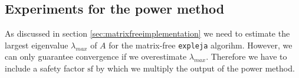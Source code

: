 \documentclass{scrartcl}
\begin{document}
	\subsection{Experiments for the power method}
	As discussed in section \ref{sec:matrixfreeimplementation} we need to estimate the largest eigenvalue $\lambda_{max}$ of $A$ for the matrix-free \texttt{expleja} algorihm. However, we can only guarantee convergence if we overestimate $\lambda_{max}$. Therefore we have to include a safety factor $\text{sf}$ by which we multiply the output of the power method. 
	
\end{document}
